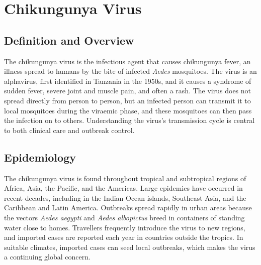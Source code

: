 \chapter{Chikungunya Virus}

\section*{Definition and Overview}
The chikungunya virus is the infectious agent that causes chikungunya fever, an illness spread to humans by the bite of infected \textit{Aedes} mosquitoes. The virus is an alphavirus, first identified in Tanzania in the 1950s, and it causes a syndrome of sudden fever, severe joint and muscle pain, and often a rash. The virus does not spread directly from person to person, but an infected person can transmit it to local mosquitoes during the viraemic phase, and these mosquitoes can then pass the infection on to others. Understanding the virus's transmission cycle is central to both clinical care and outbreak control.

\section*{Epidemiology}
The chikungunya virus is found throughout tropical and subtropical regions of Africa, Asia, the Pacific, and the Americas. Large epidemics have occurred in recent decades, including in the Indian Ocean islands, Southeast Asia, and the Caribbean and Latin America. Outbreaks spread rapidly in urban areas because the vectors \textit{Aedes aegypti} and \textit{Aedes albopictus} breed in containers of standing water close to homes. Travellers frequently introduce the virus to new regions, and imported cases are reported each year in countries outside the tropics. In suitable climates, imported cases can seed local outbreaks, which makes the virus a continuing global concern.

